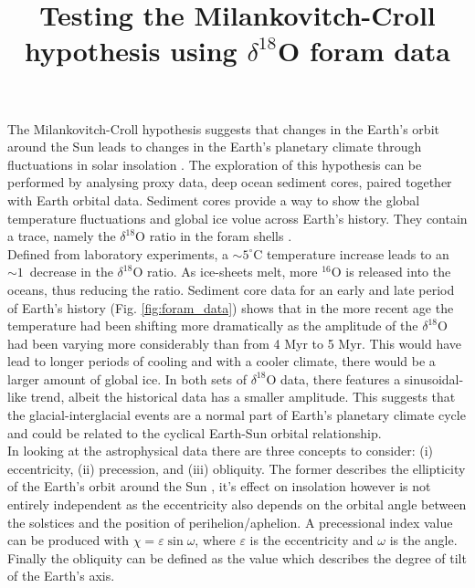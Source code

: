 \documentclass[12pt, onecolumn]{revtex4}    %
\begin{document}
                     

\title{Testing the Milankovitch-Croll hypothesis using $\delta^{18}$O foram data} 
\maketitle

\vspace{-4ex}

The Milankovitch-Croll hypothesis suggests that changes in the Earth's orbit around the Sun leads to changes in the Earth's planetary climate through fluctuations in solar insolation \cite{ruddiman_climate}. The exploration of this hypothesis can be performed by analysing proxy data, deep ocean sediment cores, paired together with Earth orbital data. Sediment cores provide a way to show the global temperature fluctuations and global ice volue across Earth's history. They contain a trace, namely the $\delta^{18}$O ratio in the foram shells \cite{droxler_climate}. \\

Defined from laboratory experiments, a $\sim 5^{\circ}\mathrm{C}$ temperature increase leads to an $\sim 1$\textperthousand\ decrease in the $\delta^{18}$O ratio. As ice-sheets melt, more $^{16}$O is released into the oceans, thus reducing the ratio. Sediment core data for an early and late period of Earth's history (Fig. \ref{fig:foram_data}) shows that in the more recent age the temperature had been shifting more dramatically as the amplitude of the $\delta^{18}$O had been varying more considerably than from 4 Myr to 5 Myr. This would have lead to longer periods of cooling and with a cooler climate, there would be a larger amount of global ice. In both sets of $\delta^{18}$O data, there features a sinusoidal-like trend, albeit the historical data has a smaller amplitude. This suggests that the glacial-interglacial events are a normal part of Earth's planetary climate cycle and could be related to the cyclical Earth-Sun orbital relationship. \\

In looking at the astrophysical data there are three concepts to consider: (i) eccentricity, (ii) precession, and (iii) obliquity. The former describes the ellipticity of the Earth's orbit around the Sun \cite{carroll_astro}, it's effect on insolation however is not entirely independent as the eccentricity also depends on the orbital angle between the solstices and the position of perihelion/aphelion. A precessional index value can be produced with $\chi= \varepsilon \sin{\omega}$, where $\varepsilon$ is the eccentricity and $\omega$ is the angle. Finally the obliquity can be defined as the value which describes the degree of tilt of the Earth's axis. \\
\end{document}
